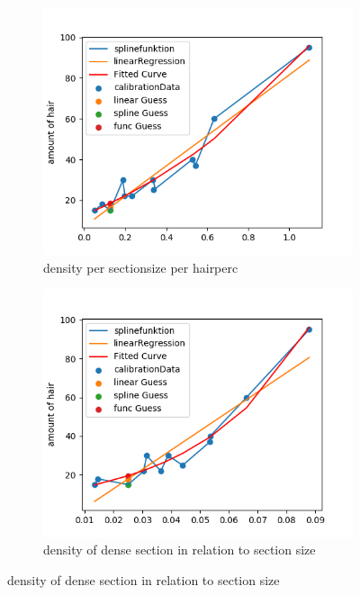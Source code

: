 \documentclass[german,a4paper, 12pt]{scrartcl}
\begin{document}
\begin{figure}[H]
\medskip
\begin{subfigure}{0.48\textwidth}
	\includegraphics[width=1.1\linewidth]{fig64/g03_densitynorm2.png}
	\caption{density per sectionsize per hairperc} \label{fig:c}
\end{subfigure}\hspace*{\fill}
\begin{subfigure}{0.48\textwidth}
	\includegraphics[width=1.1\linewidth]{fig64/g04_densityDenseSections.png}
	\caption{density of dense section in relation to section size} \label{fig:d}
\end{subfigure}


\end{figure}
\end{document}
